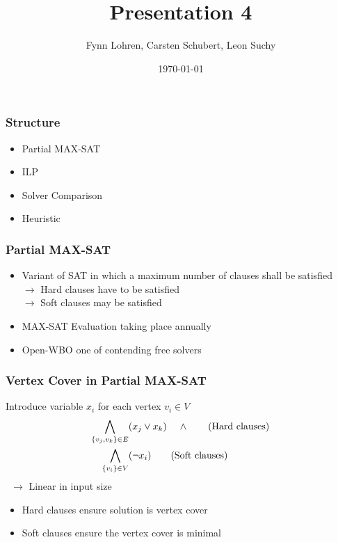 \documentclass{beamer}[12pt]
\begin{document}
	\title{Presentation 4}
	\author{Fynn Lohren, Carsten Schubert, Leon Suchy}
	\date{\today}
	\frame{\titlepage}
	
	\begin{frame}
		\frametitle{Structure}
		\begin{itemize}
			\item Partial MAX-SAT
			\item ILP
			\item Solver Comparison
			\item Heuristic
		\end{itemize}
	\end{frame}


	\begin{frame}
	\frametitle{Partial MAX-SAT}
	\begin{itemize}
		\item Variant of SAT in which a maximum number of clauses shall be satisfied\\
			$\rightarrow$ Hard clauses have to be satisfied \\
			$\rightarrow$ Soft clauses may be satisfied \\
		\pause
		\item MAX-SAT Evaluation taking place annually
		\item Open-WBO one of contending free solvers
		\end{itemize}
	\end{frame}

	\begin{frame}
	\frametitle{Vertex Cover in Partial MAX-SAT}
		Introduce variable $ x_i $ for each vertex $ v_i \in V$ 
		\begin{align*}
			\bigwedge\limits_{\{v_j, v_k\} \in E} & (x_j \lor x_k) \hspace{4mm}\land \tag{Hard clauses}\\
			\bigwedge\limits_{\{v_i\} \in V} & (\neg x_i) \tag{Soft clauses}\\
		\end{align*}
		\pause\
		\qquad $\rightarrow$ Linear in input size
		\vspace*{1.5mm}
		\begin{itemize}
			\item Hard clauses ensure solution is vertex cover
			\item Soft clauses ensure the vertex cover is minimal
		\end{itemize}
	\end{frame}
	
\end{document}
